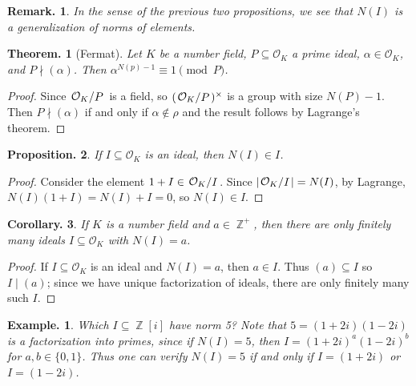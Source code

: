\documentclass[11pt, a4paper]{memoir}
\DeclareMathOperator{\Z}{{\mathbb{Z}}}
\newcommand{\abs}[1]{\ensuremath{\left\lvert#1\right\rvert}}
\theoremstyle{change}
\newtheorem{theorem}{Theorem.}[section]
\newtheorem{corollary}[theorem]{Corollary.}
\newtheorem{proposition}[theorem]{Proposition.}
\theoremstyle{plain}
\theoremstyle{nonumberplain}
\newtheorem{example}{Example.}
\newtheorem{remark}{Remark.}
\newtheorem{proof}{Proof}
\newcommand{\quot}[2]{\mathchoice{\left.\raisebox{0.07em}{$#1$}\middle/\raisebox{-0.07em}{$#2$}\right.}
                                 {\left.\raisebox{0.03em}{$#1$}\middle/\raisebox{-0.03em}{$#2$}\right.}
                                 {\left.\raisebox{0.00em}{$#1$}\middle/\raisebox{-0.00em}{$#2$}\right.}
                                 {\left.\raisebox{0em}{$#1$}\middle/\raisebox{0em}{$#2$}\right.}}
\numberwithin{equation}{section}
\begin{document}
\begin{remark}
    In the sense of the previous two propositions, we see that $N(I)$ is a generalization of norms of elements.
\end{remark}
\begin{theorem}[Fermat]
    Let $K$ be a number field, $P\subseteq\mathcal{O}_K$ a prime ideal, $\alpha\in\mathcal{O}_K$, and $P\nmid(\alpha)$.
    Then $\alpha^{N(p)-1}\equiv 1\pmod{P}$.
\end{theorem}
\begin{proof}
    Since $\quot{\mathcal{O}_K}{P}$ is a field, so $(\quot{\mathcal{O}_K}{P})^\times$ is a group with size $N(P)-1$.
    Then $P\nmid(\alpha)$ if and only if $\alpha\notin\rho$ and the result follows by Lagrange's theorem.
\end{proof}
\begin{proposition}\label{p:norm-in-id}
    If $I\subseteq\mathcal{O}_K$ is an ideal, then $N(I)\in I$.
\end{proposition}
\begin{proof}
    Consider the element $1+I\in\quot{\mathcal{O}_K}{I}$.
    Since $\abs{\quot{\mathcal{O}_K}{I}}=N(I)$, by Lagrange, $N(I)(1+I)=N(I)+I=0$, so $N(I)\in I$.
\end{proof}
\begin{corollary}\label{cor:fin-norm}
    If $K$ is a number field and $a\in\Z^+$, then there are only finitely many ideals $I\subseteq\mathcal{O}_K$ with $N(I)=a$.
\end{corollary}
\begin{proof}
    If $I\subseteq\mathcal{O}_K$ is an ideal and $N(I)=a$, then $a\in I$.
    Thus $(a)\subseteq I$ so $I\mid (a)$; since we have unique factorization of ideals, there are only finitely many such $I$.
\end{proof}
\begin{example}
    Which $I\subseteq\Z[i]$ have norm 5?
    Note that $5=(1+2i)(1-2i)$ is a factorization into primes, since if $N(I)=5$, then $I=(1+2i)^a(1-2i)^b$ for $a,b\in\{0,1\}$.
    Thus one can verify $N(I)=5$ if and only if $I=(1+2i)$ or $I=(1-2i)$.
\end{example}
\end{document}
